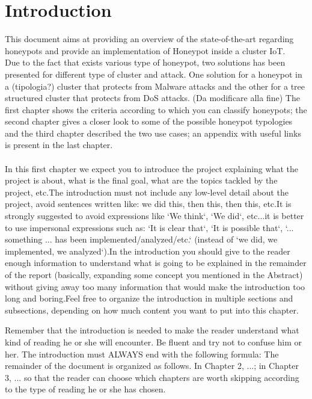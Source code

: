 \chapter{Introduction}
This document aims at providing an overview of the state-of-the-art regarding honeypots and provide an implementation of Honeypot inside a cluster IoT.\\
Due to the fact that exists various type of honeypot,  two solutions has been presented for different type of cluster and attack. One solution for a honeypot in a (tipologia?) cluster that protects from Malware attacks and the other for a tree structured cluster that protects from DoS attacks. 
(Da modificare alla fine)
The first chapter shows the criteria according to which you can classify honeypots; the second chapter gives a closer look to some of the possible honeypot typologies and the third chapter described the two use cases; an appendix with useful links is present in the last chapter.
\\\\
In this first chapter we expect you to introduce the project explaining what the project is about, what is the final goal, what are the topics tackled by the project, etc.\newline The introduction must not include any low-level detail about the project, avoid sentences written like: we did this, then this, then this, etc.\newline It is strongly suggested to avoid expressions like `We think`, `We did`, etc...it is better to use impersonal expressions such as: `It is clear that`, `It is possible that`, `... something ... has been implemented/analyzed/etc.` (instead of `we did, we implemented, we analyzed`).\newline In the introduction you should give to the reader enough information to understand what is going to be explained in the remainder of the report (basically, expanding some concept you mentioned in the Abstract) without giving away too many information that would make the introduction too long and boring.\newline Feel free to organize the introduction in multiple sections and subsections, depending on how much content you want to put into this chapter.

Remember that the introduction is needed to make the reader understand what kind of reading he or she will encounter. Be fluent and try not to confuse him or her.
The introduction must ALWAYS end with the following formula: The remainder of the document is organized as follows. In Chapter 2, ...; in Chapter 3, ... so that the reader can choose which chapters are worth skipping according to the type of reading he or she has chosen.
